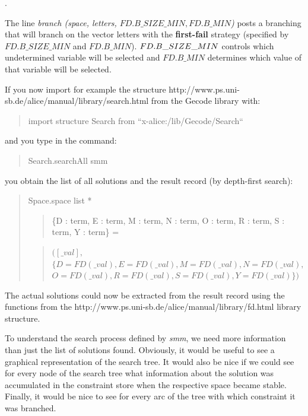 \documentclass[a4paper,halfparskip]{scrartcl}
\begin{document}
. 

The line \emph{branch (space, letters, $ FD.B\_SIZE\_MIN, FD.B\_MIN$)} posts 
a branching that will branch on the vector letters with the 
\textbf{first-fail} strategy (specified by $FD.B\_SIZE\_MIN$ and $FD.B\_MIN$). 
$\emph{FD.B\_SIZE\_MIN}$ controls which undetermined variable will be
selected and \emph{$ FD.B\_MIN $} determines which value of that variable
will be selected.

If you now import for example the structure
\htmladdnormallink{\textcolor{blue}{Search}}
{http://www.ps.uni-sb.de/alice/manual/library/search.html}
from the Gecode library with:
\begin{quote}
import structure Search from ``x-alice:/lib/Gecode/Search``
\end{quote}
and you type in the command:
\begin{quote}
Search.searchAll smm
\end{quote}
you obtain the list of all solutions and the result record
(by depth-first search):
\begin{quote}
Space.space list *
\begin{quote}
      \{D : term, E : term, M : term, N : term, O : term, R : term, S : term,
       Y : term\} =
\end{quote}
\begin{quote}
   $ ([\_val],$\\
   $ \{D = FD (\_val), E = FD (\_val), M = FD (\_val), N = FD (\_val),$\\ 
   $ O = FD (\_val), R = FD (\_val), S = FD (\_val), Y = FD (\_val)\})$\\
\end{quote}
\end{quote}


The actual solutions could now be extracted from the result 
record using the functions from the
\htmladdnormallink{\textcolor{blue}{FD.Reflect}}
{http://www.ps.uni-sb.de/alice/manual/library/fd.html}
library structure.

To understand the search process defined by \emph{smm}, we need more 
information than just the list of solutions found. Obviously, it would 
be useful to see a graphical representation of the search tree. It
would also be nice if we could see for every node of the search tree 
what information about the solution was accumulated in the constraint 
store when the respective space became stable. Finally, it would be
nice to see for every arc of the tree with which constraint it was 
branched.
\end{document}
